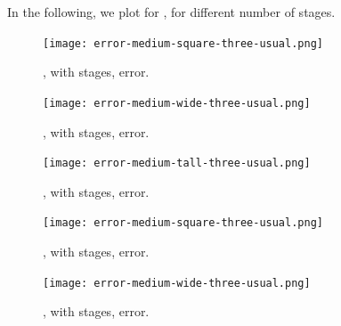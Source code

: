 In the following, we plot for , for different number of stages.
%
\begin {figure} [H]
\texttt{[image: error-medium-square-three-usual.png]}
\caption {, with  stages, error.}
\end {figure}
%
\begin {figure} [H]
\texttt{[image: error-medium-wide-three-usual.png]}
\caption {, with  stages, error.}
\end {figure}
%
\begin {figure} [H]
\texttt{[image: error-medium-tall-three-usual.png]}
\caption {, with  stages, error.}
\end {figure}
%
\begin {figure} [H]
\texttt{[image: error-medium-square-three-usual.png]}
\caption {, with  stages, error.}
\end {figure}
%
\begin {figure} [H]
\texttt{[image: error-medium-wide-three-usual.png]}
\caption {, with  stages, error.}
\end {figure}
%
